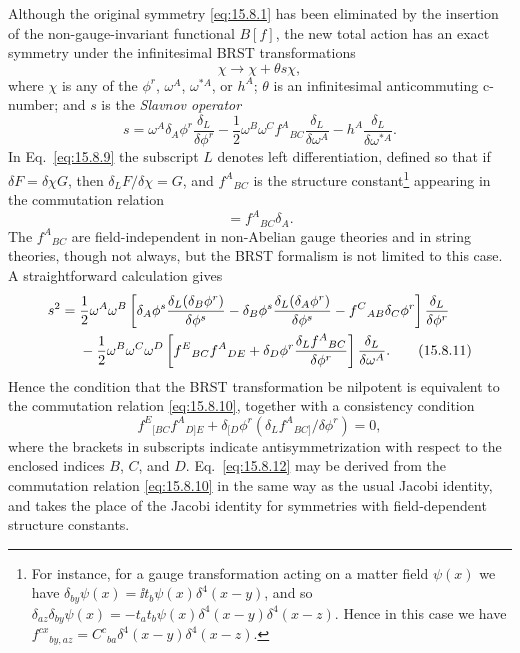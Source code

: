 Although the original symmetry \eqref{eq:15.8.1} has been eliminated by the insertion of the non-gauge-invariant functional $B[f]$, the new total action has an exact symmetry under the infinitesimal BRST transformations
\begin{equation}
 \chi\longrightarrow\chi+\theta s\chi,
 \tag{15.8.8}\label{eq:15.8.8}
\end{equation}
where $\chi$ is any of the $\phi^r$, $\omega^A$, $\omega^{*A}$, or $h^A$; $\theta$ is an infinitesimal anticommuting c-number; and $s$ is the \emph{Slavnov operator}
\begin{equation}
 s=\omega^A\delta_A\phi^r\frac{\delta_L}{\delta\phi^r}
 -\frac{1}{2}\omega^B\omega^Cf^A{}_{BC}\frac{\delta_L}{\delta\omega^A}
 -h^A\frac{\delta_L}{\delta\omega^{*A}}.
 \tag{15.8.9}\label{eq:15.8.9}
\end{equation}
In Eq.~\eqref{eq:15.8.9} the subscript $L$ denotes left differentiation, defined so that if $\delta F=\delta\chi G$, then $\delta_LF/\delta\chi=G$, and $f^A{}_{BC}$ is the structure constant\footnote{For instance, for a gauge transformation acting on a matter field $\psi(x)$ we have $\delta_{b y}\psi(x)=\ii t_b\psi(x)\delta^4(x-y)$, and so $\delta_{a z}\delta_{b y}\psi(x)=-t_a t_b\psi(x)\delta^4(x-y)\delta^4(x-z)$. Hence in this case we have $f^{c x}{}_{b y,a z}=C^c{}_{ba}\delta^4(x-y)\delta^4(x-z)$.} appearing in the commutation relation
\begin{equation}
 [\delta_B,\delta_C]=f^A{}_{BC}\delta_A.
 \tag{15.8.10}\label{eq:15.8.10}
\end{equation}
The $f^A{}_{BC}$ are field-independent in non-Abelian gauge theories and in string theories, though not always, but the BRST formalism is not limited to this case. A straightforward calculation gives
\begin{align}
 s^2={}&\frac{1}{2}\omega^A\omega^B
 \left[\delta_A\phi^s\frac{\delta_L(\delta_B\phi^r)}{\delta\phi^s}
 -\delta_B\phi^s\frac{\delta_L(\delta_A\phi^r)}{\delta\phi^s}
 -f^C{}_{AB}\delta_C\phi^r\right]\frac{\delta_L}{\delta\phi^r}\notag\\
 &-\frac{1}{2}\omega^B\omega^C\omega^D
 \left[f^E{}_{BC}f^A{}_{DE}
 +\delta_D\phi^r\frac{\delta_Lf^A{}_{BC}}{\delta\phi^r}\right]
 \frac{\delta_L}{\delta\omega^A}.
 \tag{15.8.11}\label{eq:15.8.11}
\end{align}
Hence the condition that the BRST transformation be nilpotent is equivalent to the commutation relation \eqref{eq:15.8.10}, together with a consistency condition
\begin{equation}
 f^E{}_{[BC}f^A{}_{D]E}
 +\delta_{[D}\phi^r\left(\delta_Lf^A{}_{BC]}/\delta\phi^r\right)=0,
 \tag{15.8.12}\label{eq:15.8.12}
\end{equation}
where the brackets in subscripts indicate antisymmetrization with respect to the enclosed indices $B$, $C$, and $D$. Eq.~\eqref{eq:15.8.12} may be derived from the commutation relation \eqref{eq:15.8.10} in the same way as the usual Jacobi identity, and takes the place of the Jacobi identity for symmetries with field-dependent structure constants.

